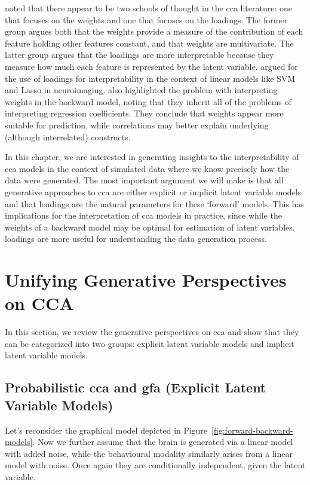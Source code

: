 \citet{gu2018simultaneous} noted that there appear to be two schools of thought in the \acrshort{cca} literature: one that focuses on the weights and one that focuses on the loadings.
The former group argues both that the weights provide a measure of the contribution of each feature holding other features constant, and that weights are multivariate.
The latter group argues that the loadings are more interpretable because they measure how much each feature is represented by the latent variable.
\citet{haufe2014interpretation} argued for the use of loadings for interpretability in the context of linear models like SVM and Lasso in neuroimaging.
\citet{alpert1972interpretation} also highlighted the problem with interpreting weights in the backward model, noting that they inherit all of the problems of interpreting regression coefficients.
They conclude that weights appear more suitable for prediction, while correlations may better explain underlying (although interrelated) constructs.

In this chapter, we are interested in generating insights to the interpretability of \acrshort{cca} models in the context of simulated data where we know precisely how the data were generated.
The most important argument we will make is that all generative approaches to \acrshort{cca} are either explicit or implicit latent variable models and that loadings are the natural parameters for these `forward' models.
This has implications for the interpretation of \acrshort{cca} models in practice, since while the weights of a backward model may be optimal for estimation of latent variables, loadings are more useful for understanding the data generation process.

\section{Unifying Generative Perspectives on CCA}\label{sec:generative-perspectives}

In this section, we review the generative perspectives on \acrshort{cca} and show that they can be categorized into two groups: explicit latent variable models and implicit latent variable models.

\subsection{Probabilistic \acrshort{cca} and \acrshort{gfa} (Explicit Latent Variable Models)}

Let's reconsider the graphical model depicted in Figure~\ref{fig:forward-backward-models}.
Now we further assume that the brain is generated via a linear model with added noise, while the behavioural modality similarly arises from a linear model with noise.
Once again they are conditionally independent, given the latent variable.

